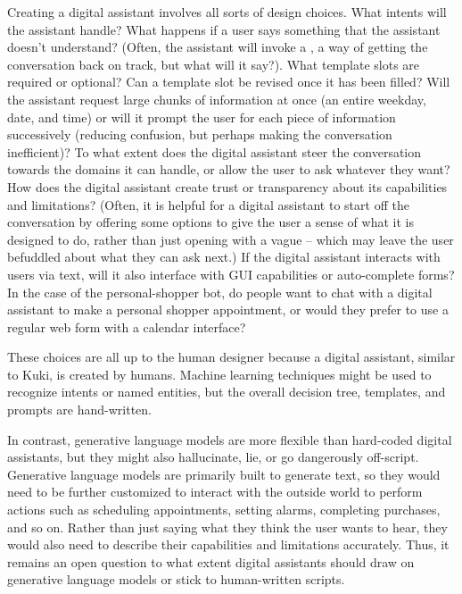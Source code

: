 Creating a digital assistant involves all sorts of design choices.  What intents will the assistant handle? What happens if a user says something that the assistant doesn't understand? (Often, the assistant will invoke a , a way of getting the conversation back on track, but what will it say?). What template slots are required or optional?  Can a template slot be revised once it has been filled? Will the assistant request large chunks of information at once (an entire weekday, date, and time) or will it prompt the user for each piece of information successively (reducing confusion, but perhaps making the conversation inefficient)?  To what extent does the digital assistant steer the conversation towards the domains it can handle, or allow the user to ask whatever they want?  How does the digital assistant create trust or transparency about its capabilities and limitations?  (Often, it is helpful for a digital assistant to start off the conversation by offering some options to give the user a sense of what it is designed to do, rather than just opening with a vague  -- which may leave the user befuddled about what they can ask next.) If the digital assistant interacts with users via text, will it also interface with GUI capabilities or auto-complete forms?  In the case of the personal-shopper bot, do people want to chat with a digital assistant to make a personal shopper appointment, or would they prefer to use a regular web form with a calendar interface?

These choices are all up to the human designer because a digital assistant, similar to Kuki, is created by humans.  Machine learning techniques might be used to recognize intents or named entities, but the overall decision tree, templates, and prompts are hand-written.

In contrast, generative language models are more flexible than hard-coded digital assistants, but they might also hallucinate, lie, or go dangerously off-script.  Generative language models are primarily built to generate text, so they would need to be further customized to interact with the outside world to perform actions such as scheduling appointments, setting alarms, completing purchases, and so on.  Rather than just saying what they think the user wants to hear, they would also need to describe their capabilities and limitations accurately.  Thus, it remains an open question to what extent digital assistants should draw on generative language models or stick to human-written scripts.  


